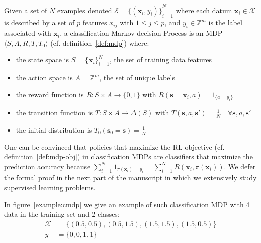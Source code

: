 \begin{definition}\label{def:cmdp}
    Given a set of $N$ examples denoted $\mathcal{E} = {\{(\boldsymbol{x}_i, y_i)\}}_{i=1}^N$ where each datum $\boldsymbol{x}_i \in \mathcal{X}$ is described by a set of $p$ features $x_{ij}$ with $1\leq j \leq p$, and $y_i \in \mathbb{Z}^m$ is the label associated with $\boldsymbol{x}_i$, a classification Markov decision Process is an MDP $\langle S, A, R, T, T_0 \rangle$ (cf. definition~\ref{def:mdp}) where:
    \begin{itemize}
        \item the state space is $S={\{\boldsymbol{x}_i\}}_{i=1}^N$, the set of training data features
        \item the action space is $A=\mathbb{Z}^m$, the set of unique labels
        \item the reward function is $R:S\times A \rightarrow \{0, 1\}$ with $R(\boldsymbol{s}=\boldsymbol{x}_i, a) = 1_{\{a=y_i\}}$
        \item the transition function is $T:S\times A \rightarrow \Delta(S)$ with $T(\boldsymbol{s}, a, \boldsymbol{s}') = \frac{1}{N} \quad \forall \boldsymbol{s}, a, \boldsymbol{s}'$
        \item the initial distribution is $T_0(\boldsymbol{s}_0 = \boldsymbol{s}) = \frac{1}{N}$
    \end{itemize}
\end{definition}

One can be convinced that policies that maximize the RL objective (cf. definition~\ref{def:mdp-obj}) in classification MDPs are classifiers that maximize the prediction accuracy because $\sum_{i=1}^N 1_{\pi(\boldsymbol{x}_i)=y_i} = \sum_{i=1}^N R(\boldsymbol{x}_i, \pi(\boldsymbol{x}_i))$.
We defer the formal proof in the next part of the manuscript in which we extensively study supervised learning problems.

In figure~\ref{example:cmdp} we give an example of such classification MDP with 4 data in the training set and 2 classes:
\begin{align*}
    \mathcal{X} &= \{(0.5, 0.5), (0.5, 1.5), (1.5, 1.5), (1.5, 0.5)\}\\
    y &= \{0, 0, 1, 1\} 
\end{align*}

